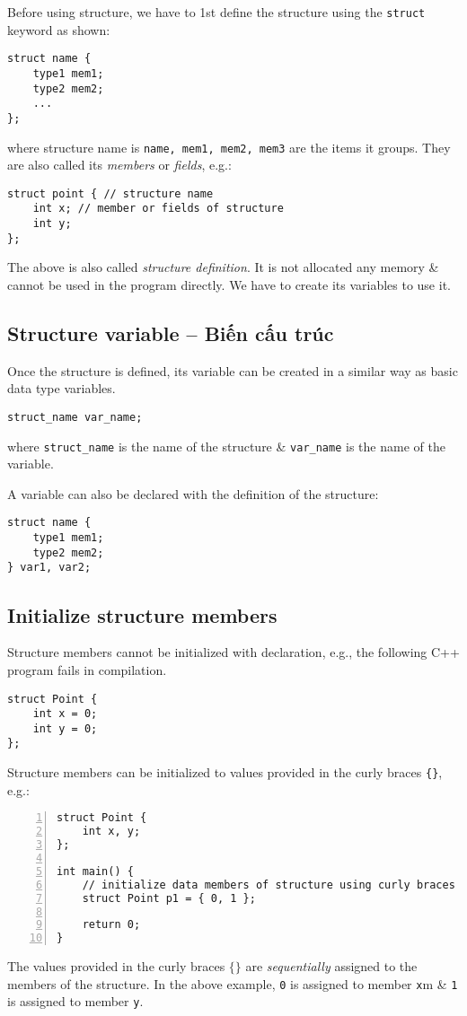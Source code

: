 \documentclass{article}
\begin{document}
 Before using structure, we have to 1st define the structure using the {\tt struct} keyword as shown:
\begin{verbatim}
struct name {
    type1 mem1;
    type2 mem2;
    ...
};
\end{verbatim}
where structure name is {\tt name, mem1, mem2, mem3} are the items it groups. They are also called its {\it members} or {\it fields}, e.g.:
\begin{verbatim}
struct point { // structure name
    int x; // member or fields of structure
    int y;
};
\end{verbatim}
The above is also called {\it structure definition}. It is not allocated any memory \& cannot be used in the program directly. We have to create its variables to use it.


\subsection{Structure variable -- Biến cấu trúc}
Once the structure is defined, its variable can be created in a similar way as basic data type variables.
\begin{verbatim}
struct_name var_name;
\end{verbatim}
where \verb|struct_name| is the name of the structure \& \verb|var_name| is the name of the variable.

A variable can also be declared with the definition of the structure:
\begin{verbatim}
struct name {
    type1 mem1;
    type2 mem2;
} var1, var2;
\end{verbatim}


\subsection{Initialize structure members}
Structure members cannot be initialized with declaration, e.g., the following C++ program fails in compilation.
\begin{verbatim}
struct Point {
    int x = 0;
    int y = 0;
};
\end{verbatim}
Structure members can be initialized to values provided in the curly braces {\tt\{\}}, e.g.:
\begin{Verbatim}[numbers=left,xleftmargin=5mm]
struct Point {
    int x, y;
};

int main() {
    // initialize data members of structure using curly braces
    struct Point p1 = { 0, 1 };
	
    return 0;
}
\end{Verbatim}
The values provided in the curly braces $\{\}$ are {\it sequentially} assigned to the members of the structure. In the above example, {\tt0} is assigned to member {\tt x}m \& {\tt1} is assigned to member {\tt y}.
\end{document}
